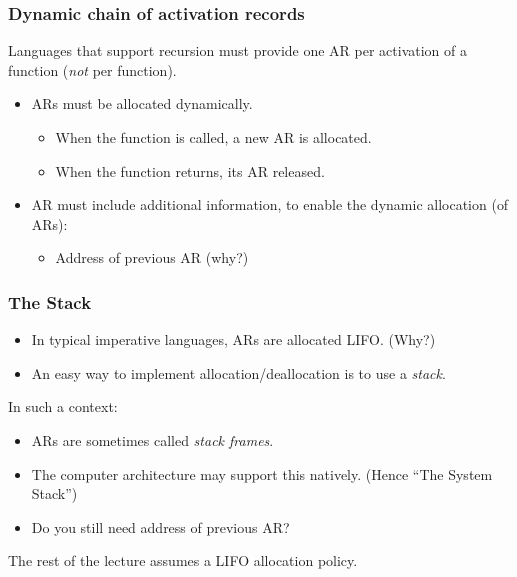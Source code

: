\documentclass{beamer}
\begin{document}
\begin{frame}[fragile]
\frametitle{Dynamic chain of activation records}

Languages that support recursion must provide one AR per
activation of a function (\emph{not} per function).

\begin{itemize}
\item ARs must be allocated dynamically.
\begin{itemize}
\item When the function is called, a new AR is allocated.
\item When the function returns, its AR released.
\end{itemize}
\item AR must include additional information, to enable the dynamic
allocation (of ARs): 
\begin{itemize}
\item Address of previous AR (why?)
\end{itemize}
\end{itemize}
\end{frame}

\begin{frame}
\frametitle{The Stack}


\begin{itemize}
\item In typical imperative languages, ARs are allocated LIFO. (Why?)
\item An easy way to implement allocation/deallocation is to use a \emph{stack}.
\end{itemize}

In such a context:
\begin{itemize}

\item ARs are sometimes called \textit{stack frames}. 

\item The computer architecture may support this natively. (Hence ``The System Stack'')

\item Do you still need address of previous AR?

\end{itemize}

The rest of the lecture assumes a LIFO allocation policy.

\end{frame}
\end{document}
